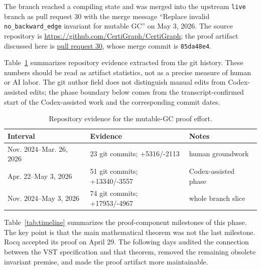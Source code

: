 \documentclass[acmsmall,nonacm]{acmart}
\newcommand{\Rocq}{Rocq}
\newcommand{\VST}{VST}
\begin{document}
The branch reached a compiling state and was merged into the upstream
\texttt{live} branch as pull request 30 with the merge message ``Replace invalid
\texttt{no\_backward\_edge} invariant for mutable GC'' on May 3, 2026.  The
source repository is \url{https://github.com/CertiGraph/CertiGraph}; the proof
artifact discussed here is \href{https://github.com/CertiGraph/CertiGraph/pull/30}{pull request 30},
whose merge commit is \texttt{85da48e4}.

Table~\ref{tab:repo-evidence} summarizes repository evidence extracted from the
git history.  These numbers should be read as artifact statistics, not as a
precise measure of human or AI labor.  The git author field does not distinguish
manual edits from Codex-assisted edits; the phase boundary below comes from the
transcript-confirmed start of the Codex-assisted work and the corresponding
commit dates.

\begin{table}[htbp]
\centering
\caption{Repository evidence for the mutable-GC proof effort.}
\label{tab:repo-evidence}
\begin{tabular}{lll}
\toprule
Interval & Evidence & Notes \\
\midrule
Nov. 2024--Mar. 26, 2026 & 23 git commits; +5316/-2113 & human groundwork \\
Apr. 22--May 3, 2026 & 51 git commits; +13340/-3557 & Codex-assisted phase \\
Nov. 2024--May 3, 2026 & 74 git commits; +17953/-4967 & whole branch slice \\
\bottomrule
\end{tabular}
\end{table}

Table~\ref{tab:timeline} summarizes the proof-component milestones of this
phase.  The key point is that the main mathematical theorem was
not the last milestone.  \Rocq{} accepted its proof on April 29.  The following
days audited the connection between the \VST{} specification and that theorem,
removed the remaining obsolete invariant premise, and made the proof artifact more
maintainable.
\end{document}
